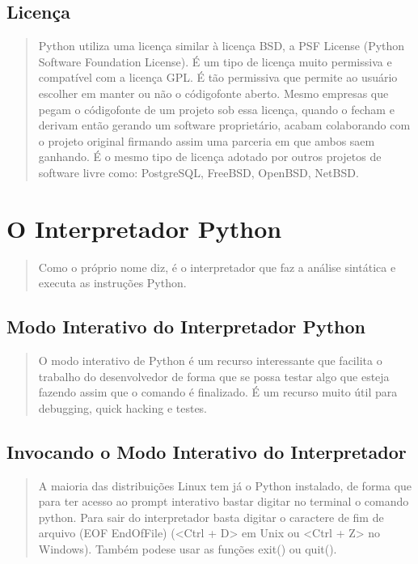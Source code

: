 \documentclass[letterpaper,10pt,brazil]{sphinxmanual}
\begin{document}
\subsection{Licença}
\label{\detokenize{content/about:licenca}}\begin{quote}

Python utiliza uma licença similar à licença BSD, a PSF License (Python Software Foundation License).
É um tipo de licença muito permissiva e compatível com a licença GPL.
É tão permissiva que permite ao usuário escolher em manter ou não o código\sphinxhyphen{}fonte aberto.
Mesmo empresas que pegam o código\sphinxhyphen{}fonte de um projeto sob essa licença, quando o fecham e derivam então gerando um software proprietário, acabam colaborando com o projeto original firmando assim uma parceria em que ambos saem ganhando.
É o mesmo tipo de licença adotado por outros projetos de software livre como: PostgreSQL, FreeBSD, OpenBSD, NetBSD.
\end{quote}


\section{O Interpretador Python}
\label{\detokenize{content/about:o-interpretador-python}}\begin{quote}

Como o próprio nome diz, é o interpretador que faz a análise sintática e executa as instruções Python.
\end{quote}


\subsection{Modo Interativo do Interpretador Python}
\label{\detokenize{content/about:modo-interativo-do-interpretador-python}}\begin{quote}

O modo interativo de Python é um recurso interessante que facilita o trabalho do desenvolvedor de forma que se possa testar algo que esteja fazendo assim que o comando é finalizado.
É um recurso muito útil para debugging, quick hacking e testes.
\end{quote}


\subsection{Invocando o Modo Interativo do Interpretador}
\label{\detokenize{content/about:invocando-o-modo-interativo-do-interpretador}}\begin{quote}

A maioria das distribuições Linux tem já o Python instalado, de forma que para ter acesso ao prompt interativo bastar digitar no terminal o comando python.
Para sair do interpretador basta digitar o caractere de fim de arquivo (EOF \sphinxhyphen{} End\sphinxhyphen{}Of\sphinxhyphen{}File) (\textless{}Ctrl + D\textgreater{} em Unix ou \textless{}Ctrl + Z\textgreater{} no Windows). Também pode\sphinxhyphen{}se usar as funções exit() ou quit().
\end{quote}
\end{document}
